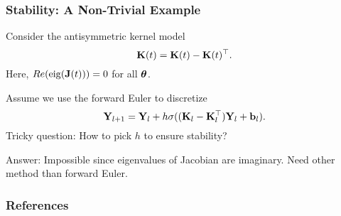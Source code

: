 \documentclass[12pt,fleqn,handout]{beamer}
\begin{document}
\begin{frame}[fragile]\frametitle{Stability: A Non-Trivial Example}

Consider the antisymmetric kernel model
$$
			{\bf K}(t) = {\bf K}(t) - {\bf K}(t)^\top.
$$
Here, $Re({\rm eig}({\bf J}(t)))= 0$ for all ${\boldsymbol \theta}$.

\bigskip
\pause
			
Assume we use the forward Euler to discretize
$$ {\bf Y}_{l+1} = {\bf Y}_{l} + h \sigma( ({\bf K}_l-{\bf K}_l^\top) {\bf Y}_l + {\bf b}_l). $$
Tricky question: How to pick $h$ to ensure stability?

\pause

Answer: Impossible since eigenvalues of Jacobian are imaginary. Need other method than forward Euler.
\end{frame}

\begin{frame}[allowframebreaks]
	\frametitle{References}



\end{frame}
\end{document}
